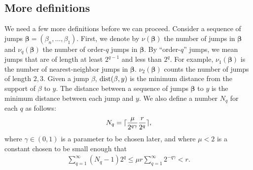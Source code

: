 \subsection{More definitions}
We need a few more definitions before we can proceed.
Consider a sequence of jumps $\bm \beta = (\beta_n,\dots,\beta_1)$.
First, we denote by $\nu(\bm \beta)$ the number of jumps in $\bm \beta$ and $\nu_{q}(\bm \beta)$ the number of order-$q$ jumps in $\bm \beta$.
By ``order-$q$'' jumps, we mean jumps that are of length at least $2^{q-1}$ and less than $2^q$.
For example, $\nu_1(\bm \beta)$ is the number of nearest-neighbor jumps in $\bm \beta$.
$\nu_2(\bm\beta)$ counts the number of jumps of length $2,3$.
Given a jump $\beta$, $\textrm{dist}(\beta,y)$ is the minimum distance from the support of $\beta$ to $y$.
The distance between a sequence of jumps $\bm\beta$ to $y$ is the minimum distance between each jump and $y$.
We also define a number $N_q$ for each $q$ as follows:
\begin{align}
	N_q = \lceil\frac{\mu}{2^{q\gamma}}\frac{r}{2^q}\rceil,\label{eq:Nq1}
\end{align}
where $\gamma\in(0,1)$ is a parameter to be chosen later, and where $\mu<2$ is a constant chosen to be small enough that
\begin{align}
	\sum_{q = 1}^{\infty} (N_q-1) 2^q \leq \mu r \sum_{q=1}^\infty 2^{-q\gamma} < r.
\end{align}



